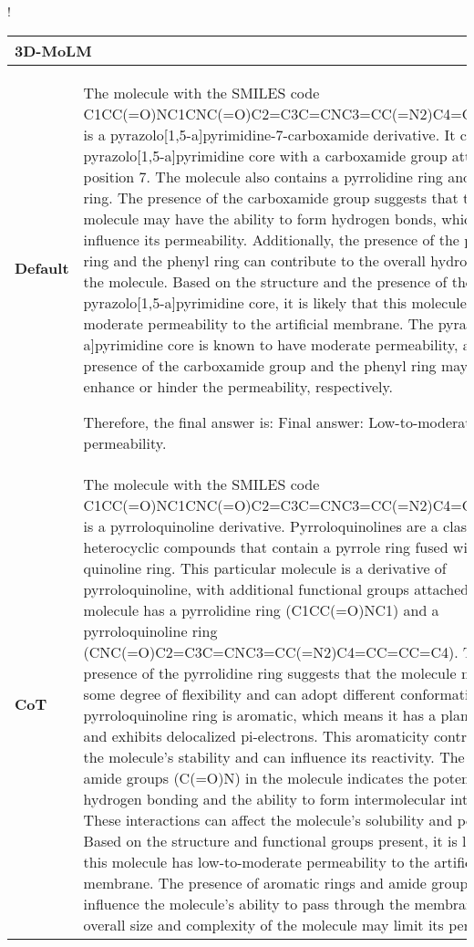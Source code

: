 
\begin{table}[ht!]
\begin{resizebox}{\linewidth}{!}{
\centering
\renewcommand{\arraystretch}{1.1}
\begin{tabular}{p{1.2cm} p{18cm}}
\toprule
\multicolumn{2}{l}{\large \textbf{3D-MoLM}}  \\
\midrule

\textbf{Default} & The molecule with the SMILES code C1CC(=O)NC1CNC(=O)C2=C3C=CNC3=CC(=N2)C4=CC=CC=C4 \textcolor{tabred}{is a pyrazolo[1,5-a]pyrimidine-7-carboxamide derivative. It consists of a pyrazolo[1,5-a]pyrimidine core with a carboxamide group attached at position 7.} The molecule also \textcolor{tabblue}{contains a pyrrolidine ring and a phenyl ring. The presence of the carboxamide group} suggests that this molecule may have the ability to form hydrogen bonds, which can influence its permeability. Additionally, \textcolor{tabblue}{the presence of the pyrrolidine ring and the phenyl ring} can contribute to the overall hydrophobicity of the molecule.
Based on the structure and the presence of the pyrazolo[1,5-a]pyrimidine core, it is likely that this molecule has low-to-moderate permeability to the artificial membrane. The pyrazolo[1,5-a]pyrimidine core is known to have moderate permeability, and the presence of the carboxamide group and the phenyl ring may slightly enhance or hinder the permeability, respectively.

Therefore, the final answer is: \textcolor{tabred}{Final answer: Low-to-moderate permeability.} \\


\midrule


\textbf{CoT} & The molecule with the SMILES code C1CC(=O)NC1CNC(=O)C2=C3C=CNC3=CC(=N2)C4=CC=CC=C4 \textcolor{tabred}{is a pyrroloquinoline derivative. Pyrroloquinolines} are a class of heterocyclic compounds that contain a pyrrole ring fused with a quinoline ring. This particular molecule \textcolor{tabred}{is a derivative of pyrroloquinoline, with additional functional groups attached.} The molecule \textcolor{tabblue}{has a pyrrolidine ring (C1CC(=O)NC1)} and a \textcolor{tabred}{pyrroloquinoline ring (CNC(=O)C2=C3C=CNC3=CC(=N2)C4=CC=CC=C4)}. The presence of the pyrrolidine ring suggests that the molecule may have some degree of flexibility and can adopt different conformations. The pyrroloquinoline ring is aromatic, which means it has a planar structure and exhibits delocalized pi-electrons. This aromaticity contributes to the molecule's stability and can influence its reactivity. \textcolor{tabblue}{The presence of amide groups (C(=O)N)} in the molecule indicates the potential for hydrogen bonding and the ability to form intermolecular interactions. These interactions can affect the molecule's solubility and permeability. Based on the structure and functional groups present, it is likely that this molecule has low-to-moderate permeability to the artificial membrane. The presence of aromatic rings and amide groups can influence the molecule's ability to pass through the membrane, but the overall size and complexity of the molecule may limit its permeability.


\end{tabular}}
\end{resizebox}
\end{table}
